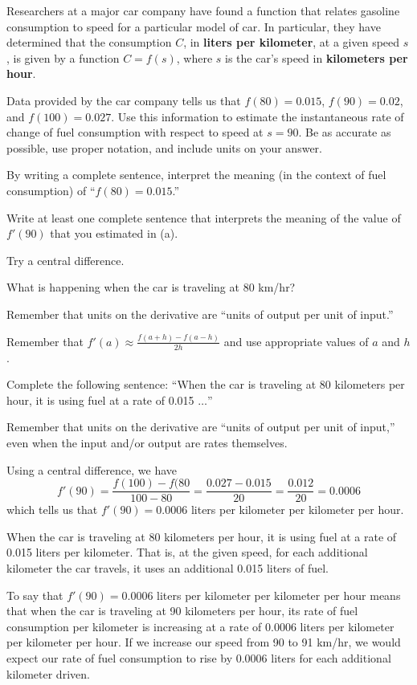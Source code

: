 \begin{activity} \label{A:1.5.3}
Researchers at a major car company have found a function that relates gasoline consumption to speed for a particular model of car.  In particular, they have determined that the consumption $C$, in {\bfseries liters per kilometer}, at a given speed $s$, is given by a function $C = f(s)$, where $s$ is the car's speed in {\bf kilometers per hour}. 
	\ba
	  \item Data provided by the car company tells us that $f(80) = 0.015$, $f(90) = 0.02$, and $f(100) = 0.027$.  Use this information to estimate the instantaneous rate of change of fuel consumption with respect to speed at $s = 90$.  Be as accurate as possible, use proper notation, and include units on your answer.
	  \item By writing a complete sentence, interpret the meaning (in the context of fuel consumption) of ``$f(80) = 0.015$.'' 
	  \item Write at least one complete sentence that interprets the meaning of the value of $f'(90)$ that you estimated in (a).
	\ea
\end{activity}
\begin{smallhint}
\ba
	\item Try a central difference.
	\item What is happening when the car is traveling at 80 km/hr?
	\item Remember that units on the derivative are ``units of output per unit of input.''
\ea
\end{smallhint}
\begin{bighint}
\ba
	\item Remember that $f'(a) \approx \frac{f(a+h)-f(a-h)}{2h}$ and use appropriate values of $a$ and $h$.
	\item Complete the following sentence: ``When the car is traveling at 80 kilometers per hour, it is using fuel at a rate of 0.015 $\ldots$''
	\item Remember that units on the derivative are ``units of output per unit of input,'' even when the input and/or output are rates themselves.
\ea
\end{bighint}
\begin{activitySolution}
\ba
	\item Using a central difference, we have
	$$f'(90) = \frac{f(100) - f(80}{100-80} = \frac{0.027 - 0.015}{20} = \frac{0.012}{20} = 0.0006$$
	which tells us that $f'(90) = 0.0006$ liters per kilometer per kilometer per hour.
	\item When the car is traveling at 80 kilometers per hour, it is using fuel at a rate of 0.015 liters per kilometer.  That is, at the given speed, for each additional kilometer the car travels, it uses an additional 0.015 liters of fuel.
	\item To say that $f'(90) = 0.0006$ liters per kilometer per kilometer per hour means that when the car is traveling at 90 kilometers per hour, its rate of fuel consumption per kilometer is increasing at a rate of 0.0006 liters per kilometer per kilometer per hour.  If we increase our speed from 90 to 91 km/hr, we would expect our rate of fuel consumption to rise by 0.0006 liters for each additional kilometer driven.
\ea
\end{activitySolution}
\aftera